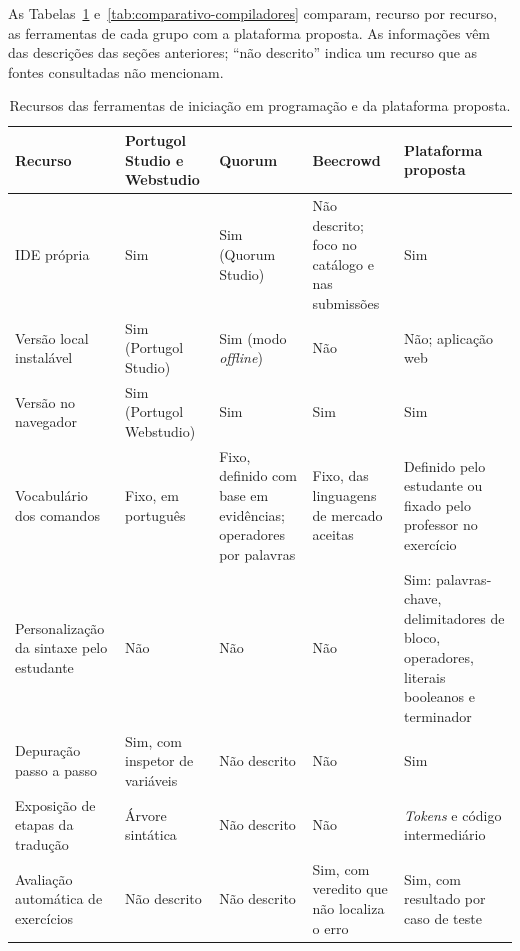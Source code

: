 As Tabelas~\ref{tab:comparativo-iniciacao} e~\ref{tab:comparativo-compiladores} comparam, recurso por recurso, as ferramentas de cada grupo com a plataforma proposta. As informações vêm das descrições das seções anteriores; ``não descrito'' indica um recurso que as fontes consultadas não mencionam.

\begin{table}[htbp]
\centering
\caption{Recursos das ferramentas de iniciação em programação e da plataforma proposta.}
\label{tab:comparativo-iniciacao}
\footnotesize
\setlength{\tabcolsep}{3pt}
\renewcommand{\arraystretch}{1.15}
\begin{tabular}{|>{\raggedright\arraybackslash}p{}|>{\raggedright\arraybackslash}p{}|>{\raggedright\arraybackslash}p{}|>{\raggedright\arraybackslash}p{}|>{\raggedright\arraybackslash}p{}|}
\hline
\textbf{Recurso} & \textbf{Portugol Studio e Webstudio} & \textbf{Quorum} & \textbf{Beecrowd} & \textbf{Plataforma proposta} \\
\hline
IDE própria & Sim & Sim (Quorum Studio) & Não descrito; foco no catálogo e nas submissões & Sim \\
\hline
Versão local instalável & Sim (Portugol Studio) & Sim (modo \textit{offline}) & Não & Não; aplicação web \\
\hline
Versão no navegador & Sim (Portugol Webstudio) & Sim & Sim & Sim \\
\hline
Vocabulário dos comandos & Fixo, em português & Fixo, definido com base em evidências; operadores por palavras & Fixo, das linguagens de mercado aceitas & Definido pelo estudante ou fixado pelo professor no exercício \\
\hline
Personalização da sintaxe pelo estudante & Não & Não & Não & Sim: palavras-chave, delimitadores de bloco, operadores, literais booleanos e terminador \\
\hline
Depuração passo a passo & Sim, com inspetor de variáveis & Não descrito & Não & Sim \\
\hline
Exposição de etapas da tradução & Árvore sintática & Não descrito & Não & \textit{Tokens} e código intermediário \\
\hline
Avaliação automática de exercícios & Não descrito & Não descrito & Sim, com veredito que não localiza o erro & Sim, com resultado por caso de teste \\
\hline

\end{tabular}
\end{table}
